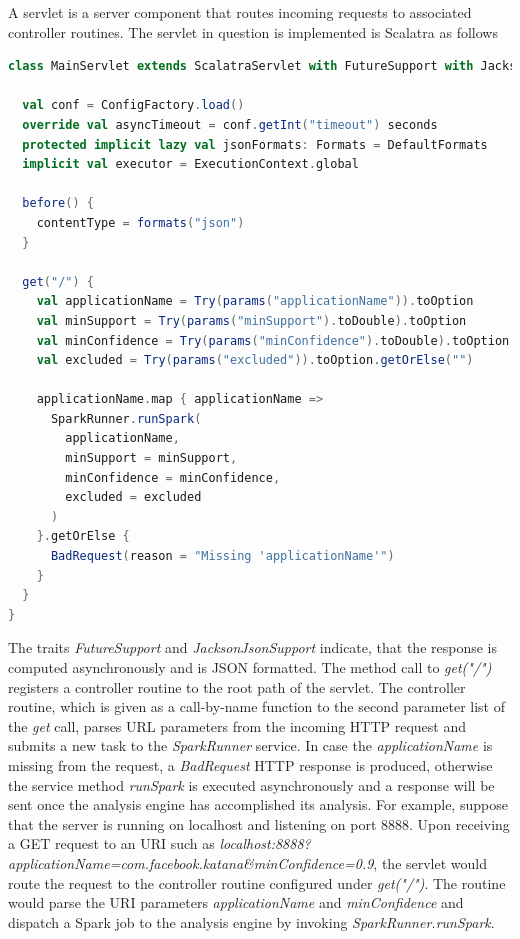 A servlet is a server component that routes incoming requests to associated controller routines. The servlet in question is implemented is Scalatra as follows

\begin{minipage}{\linewidth}
\begin{lstlisting}[language=scala]
class MainServlet extends ScalatraServlet with FutureSupport with JacksonJsonSupport {

  val conf = ConfigFactory.load()
  override val asyncTimeout = conf.getInt("timeout") seconds
  protected implicit lazy val jsonFormats: Formats = DefaultFormats
  implicit val executor = ExecutionContext.global
  
  before() {
    contentType = formats("json")
  }
	
  get("/") {
    val applicationName = Try(params("applicationName")).toOption
	val minSupport = Try(params("minSupport").toDouble).toOption
	val minConfidence = Try(params("minConfidence").toDouble).toOption
    val excluded = Try(params("excluded")).toOption.getOrElse("")

    applicationName.map { applicationName =>
      SparkRunner.runSpark(
        applicationName,
        minSupport = minSupport,
        minConfidence = minConfidence,
        excluded = excluded
      )
    }.getOrElse {
      BadRequest(reason = "Missing 'applicationName'")
    }
  }
}
\end{lstlisting}
\end{minipage}  

The traits \textit{FutureSupport} and \textit{JacksonJsonSupport} indicate, that the response is computed asynchronously and is JSON formatted. The method call to \textit{get("/")} registers a controller routine to the root path of the servlet. The controller routine, which is given as a call-by-name function to the second parameter list of the \textit{get} call, parses URL parameters from the incoming HTTP request and submits a new task to the \textit{SparkRunner} service. In case the \textit{applicationName} is missing from the request, a \textit{BadRequest} HTTP response is produced, otherwise the service method \textit{runSpark} is executed asynchronously and a response will be sent once the analysis engine has accomplished its analysis. For example, suppose that the server is running on localhost and listening on port 8888. Upon receiving a GET request to an URI such as \textit{localhost:8888?applicationName=com.facebook.katana\&minConfidence=0.9}, the servlet would route the request to the controller routine configured under \textit{get("/")}. The routine would parse the URI parameters \textit{applicationName} and \textit{minConfidence} and dispatch a Spark job to the analysis engine by invoking \textit{SparkRunner.runSpark}.  



